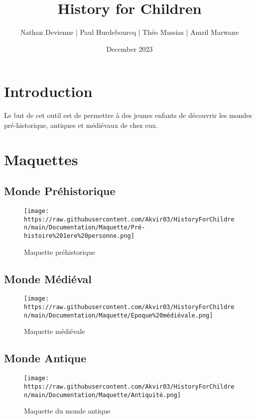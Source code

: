 \documentclass{article}
\title{History for Children}
\author{Nathan Devienne | Paul Hurdebourcq | Théo Massias | Amzil Marwane}
\date{December 2023}
\begin{document}
\maketitle

\section{Introduction}
Le but de cet outil est de permettre à des jeunes enfants de découvrir les mondes pré-historique, antiques et médiévaux de chez eux.

\section{Maquettes}
\subsection{Monde Préhistorique}
\begin{figure}
    \centering
    \texttt{[image: https://raw.githubusercontent.com/Akvir03/HistoryForChildren/main/Documentation/Maquette/Pré-histoire\%201ere\%20personne.png]}
    \caption{Maquette préhistorique}
    \label{fig:enter-label}
\end{figure}

\subsection{Monde Médiéval}
\begin{figure}
    \centering
    \texttt{[image: https://raw.githubusercontent.com/Akvir03/HistoryForChildren/main/Documentation/Maquette/Epoque\%20médiévale.png]}
    \caption{Maquette médiévale}
    \label{fig:enter-label}
\end{figure}

\subsection{Monde Antique}
\begin{figure}
    \centering
    \texttt{[image: https://raw.githubusercontent.com/Akvir03/HistoryForChildren/main/Documentation/Maquette/Antiquité.png]}
    \caption{Maquette du monde antique}
    \label{fig:enter-label}
\end{figure}
\end{document}
